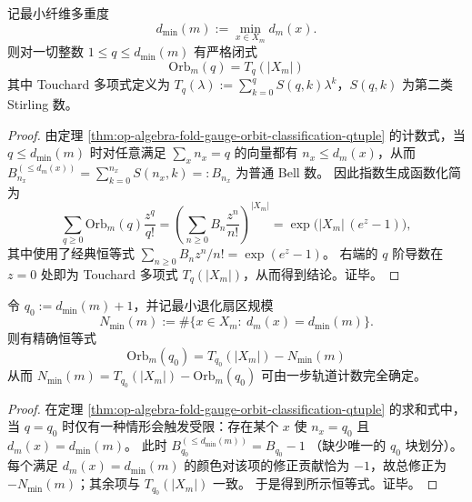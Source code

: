 \begin{theorem}\label{thm:op-algebra-fold-orbit-touchard-loworder}
记最小纤维多重度
\[
d_{\min}(m):=\min_{x\in X_m} d_m(x).
\]
则对一切整数 \(1\le q\le d_{\min}(m)\) 有严格闭式
\[
\boxed{\;\mathrm{Orb}_m(q)=T_q(|X_m|)\;}
\]
其中 Touchard 多项式定义为 \(T_q(\lambda):=\sum_{k=0}^{q}S(q,k)\lambda^k\)，\(S(q,k)\) 为第二类 Stirling 数。
\end{theorem}
\begin{proof}
由定理 \ref{thm:op-algebra-fold-gauge-orbit-classification-qtuple} 的计数式，当 \(q\le d_{\min}(m)\) 时对任意满足 \(\sum_x n_x=q\) 的向量都有 \(n_x\le d_m(x)\)，从而
\(
B_{n_x}^{(\le d_m(x))}=\sum_{k=0}^{n_x}S(n_x,k)=:B_{n_x}
\)
为普通 Bell 数。
因此指数生成函数化简为
\[
\sum_{q\ge 0}\mathrm{Orb}_m(q)\frac{z^q}{q!}
=\left(\sum_{n\ge 0}B_n\frac{z^n}{n!}\right)^{|X_m|}
=\exp\bigl(|X_m|\,(e^{z}-1)\bigr),
\]
其中使用了经典恒等式 \(\sum_{n\ge 0}B_n z^n/n!=\exp(e^{z}-1)\)。
右端的 \(q\) 阶导数在 \(z=0\) 处即为 Touchard 多项式 \(T_q(|X_m|)\)，从而得到结论。证毕。
\end{proof}

\begin{proposition}[首次偏离项与最小退化扇区规模]\label{prop:op-algebra-fold-orbit-first-deviation-minsector}
令 \(q_0:=d_{\min}(m)+1\)，并记最小退化扇区规模
\[
N_{\min}(m):=\#\{x\in X_m:\ d_m(x)=d_{\min}(m)\}.
\]
则有精确恒等式
\[
\boxed{\;\mathrm{Orb}_m(q_0)=T_{q_0}(|X_m|)-N_{\min}(m)\;}
\]
从而 \(N_{\min}(m)=T_{q_0}(|X_m|)-\mathrm{Orb}_m(q_0)\) 可由一步轨道计数完全确定。
\end{proposition}
\begin{proof}
在定理 \ref{thm:op-algebra-fold-gauge-orbit-classification-qtuple} 的求和式中，当 \(q=q_0\) 时仅有一种情形会触发受限：存在某个 \(x\) 使 \(n_x=q_0\) 且 \(d_m(x)=d_{\min}(m)\)。
此时
\(
B_{q_0}^{(\le d_{\min}(m))}=B_{q_0}-1
\)
（缺少唯一的 \(q_0\) 块划分）。
每个满足 \(d_m(x)=d_{\min}(m)\) 的颜色对该项的修正贡献恰为 \(-1\)，故总修正为 \(-N_{\min}(m)\)；其余项与 \(T_{q_0}(|X_m|)\) 一致。
于是得到所示恒等式。证毕。
\end{proof}

